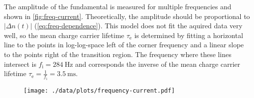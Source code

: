 The amplitude of the fundamental is measured for multiple frequencies and shown in \autoref{fig:freq-current}.
Theoretically, the amplitude should be proportional to $|\Delta n(t)|$ (\autoref{eq:freq-dependence}).
This model does not fit the aquired data very well, so the mean charge carrier lifetime $\tau_\text{e}$ is determined by fitting a horizontal line to the points in log-log-space left of the corner frequency and a linear slope to the points right of the transition region.
The frequency where these lines intersect is $f_\text{i} = \SI{284}{\hertz}$ and corresponds the inverse of the mean charge carrier lifetime $\tau_\text{e} = \frac{1}{f_\text{i}} = \SI{3.5}{\milli\second}$.
\begin{figure}
	\centering
	\texttt{[image: ./data/plots/frequency-current.pdf]}
	\label{fig:freq-current}
\end{figure}

